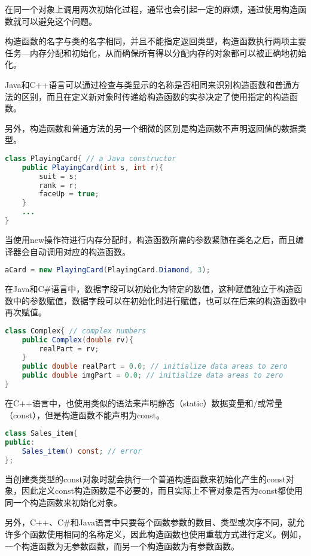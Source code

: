 在同一个对象上调用两次初始化过程，通常也会引起一定的麻烦，通过使用构造函数就可以避免这个问题。

构造函数的名字与类的名字相同，并且不能指定返回类型，构造函数执行两项主要任务—内存分配和初始化，从而确保所有得以分配内存的对象都可以被正确地初始化。

Java和C++语言可以通过检查与类显示的名称是否相同来识别构造函数和普通方法的区别，而且在定义新对象时传递给构造函数的实参决定了使用指定的构造函数。


另外，构造函数和普通方法的另一个细微的区别是构造函数不声明返回值的数据类型。

\begin{lstlisting}[language=Java]
class PlayingCard{ // a Java constructor
	public PlayingCard(int s, int r){
		suit = s;
		rank = r;
		faceUp = true;
	}
	...
}
\end{lstlisting}


当使用new操作符进行内存分配时，构造函数所需的参数紧随在类名之后，而且编译器会自动调用对应的构造函数。


\begin{lstlisting}[language=Java]
aCard = new PlayingCard(PlayingCard.Diamond, 3);
\end{lstlisting}

在Java和C\#语言中，数据字段可以初始化为特定的数值，这种赋值独立于构造函数中的参数赋值，数据字段可以在初始化时进行赋值，也可以在后来的构造函数中再次赋值。



\begin{lstlisting}[language=Java]
class Complex{ // complex numbers
	public Complex(double rv){
		realPart = rv;
	}
	public double realPart = 0.0; // initialize data areas to zero
	public double imgPart = 0.0; // initialize data areas to zero
}
\end{lstlisting}

在C++语言中，也使用类似的语法来声明静态（static）数据变量和/或常量（const），但是构造函数不能声明为const。


\begin{lstlisting}[language=Java]
class Sales_item{
public:
	Sales_item() const; // error
};
\end{lstlisting}

当创建类类型的const对象时就会执行一个普通构造函数来初始化产生的const对象，因此定义const构造函数是不必要的，而且实际上不管对象是否为const都使用同一个构造函数来初始化对象。


另外，C++、C\#和Java语言中只要每个函数参数的数目、类型或次序不同，就允许多个函数使用相同的名称定义，因此构造函数也使用重载方式进行定义。例如，一个构造函数为无参数函数，而另一个构造函数为有参数函数。


